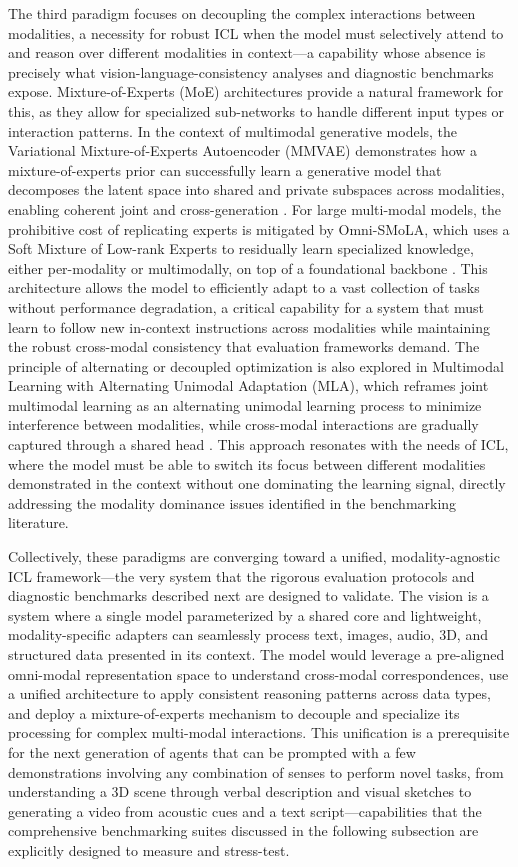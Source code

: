 \documentclass[11pt]{article}
\begin{document}
The third paradigm focuses on decoupling the complex interactions between modalities, a necessity for robust ICL when the model must selectively attend to and reason over different modalities in context---a capability whose absence is precisely what vision-language-consistency analyses and diagnostic benchmarks expose. Mixture-of-Experts (MoE) architectures provide a natural framework for this, as they allow for specialized sub-networks to handle different input types or interaction patterns. In the context of multimodal generative models, the Variational Mixture-of-Experts Autoencoder (MMVAE) demonstrates how a mixture-of-experts prior can successfully learn a generative model that decomposes the latent space into shared and private subspaces across modalities, enabling coherent joint and cross-generation \cite{ref296}. For large multi-modal models, the prohibitive cost of replicating experts is mitigated by Omni-SMoLA, which uses a Soft Mixture of Low-rank Experts to residually learn specialized knowledge, either per-modality or multimodally, on top of a foundational backbone \cite{ref297}. This architecture allows the model to efficiently adapt to a vast collection of tasks without performance degradation, a critical capability for a system that must learn to follow new in-context instructions across modalities while maintaining the robust cross-modal consistency that evaluation frameworks demand. The principle of alternating or decoupled optimization is also explored in Multimodal Learning with Alternating Unimodal Adaptation (MLA), which reframes joint multimodal learning as an alternating unimodal learning process to minimize interference between modalities, while cross-modal interactions are gradually captured through a shared head \cite{ref222}. This approach resonates with the needs of ICL, where the model must be able to switch its focus between different modalities demonstrated in the context without one dominating the learning signal, directly addressing the modality dominance issues identified in the benchmarking literature.

Collectively, these paradigms are converging toward a unified, modality-agnostic ICL framework---the very system that the rigorous evaluation protocols and diagnostic benchmarks described next are designed to validate. The vision is a system where a single model parameterized by a shared core and lightweight, modality-specific adapters can seamlessly process text, images, audio, 3D, and structured data presented in its context. The model would leverage a pre-aligned omni-modal representation space to understand cross-modal correspondences, use a unified architecture to apply consistent reasoning patterns across data types, and deploy a mixture-of-experts mechanism to decouple and specialize its processing for complex multi-modal interactions. This unification is a prerequisite for the next generation of agents that can be prompted with a few demonstrations involving any combination of senses to perform novel tasks, from understanding a 3D scene through verbal description and visual sketches to generating a video from acoustic cues and a text script---capabilities that the comprehensive benchmarking suites discussed in the following subsection are explicitly designed to measure and stress-test.
\end{document}
